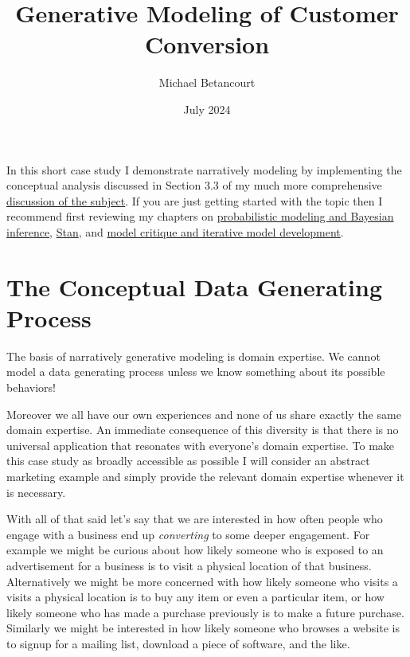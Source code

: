 \documentclass[
  letterpaper,
  DIV=11,
  numbers=noendperiod]{scrartcl}
\title{Generative Modeling of Customer Conversion}
\author{Michael Betancourt}
\date{July 2024}
\renewcommand*\contentsname{Table of contents}
\newcommand\contentsname{Table of contents}
\begin{document}
\maketitle

\renewcommand*\contentsname{Table of contents}
{
\hypersetup{linkcolor=}
\setcounter{tocdepth}{3}
\tableofcontents
}
In this short case study I demonstrate narratively modeling by
implementing the conceptual analysis discussed in Section 3.3 of my much
more comprehensive
\href{https://betanalpha.github.io/assets/case_studies/generative_modeling.html}{discussion
of the subject}. If you are just getting started with the topic then I
recommend first reviewing my chapters on
\href{https://betanalpha.github.io/assets/case_studies/modeling_and_inference.html}{probabilistic
modeling and Bayesian inference},
\href{https://betanalpha.github.io/assets/case_studies/stan_intro.html}{Stan},
and
\href{https://betanalpha.github.io/assets/case_studies/principled_bayesian_workflow.html}{model
critique and iterative model development}.

\section{The Conceptual Data Generating
Process}\label{the-conceptual-data-generating-process}

The basis of narratively generative modeling is domain expertise. We
cannot model a data generating process unless we know something about
its possible behaviors!

Moreover we all have our own experiences and none of us share exactly
the same domain expertise. An immediate consequence of this diversity is
that there is no universal application that resonates with everyone's
domain expertise. To make this case study as broadly accessible as
possible I will consider an abstract marketing example and simply
provide the relevant domain expertise whenever it is necessary.

With all of that said let's say that we are interested in how often
people who engage with a business end up \emph{converting} to some
deeper engagement. For example we might be curious about how likely
someone who is exposed to an advertisement for a business is to visit a
physical location of that business. Alternatively we might be more
concerned with how likely someone who visits a visits a physical
location is to buy any item or even a particular item, or how likely
someone who has made a purchase previously is to make a future purchase.
Similarly we might be interested in how likely someone who browses a
website is to signup for a mailing list, download a piece of software,
and the like.
\end{document}
